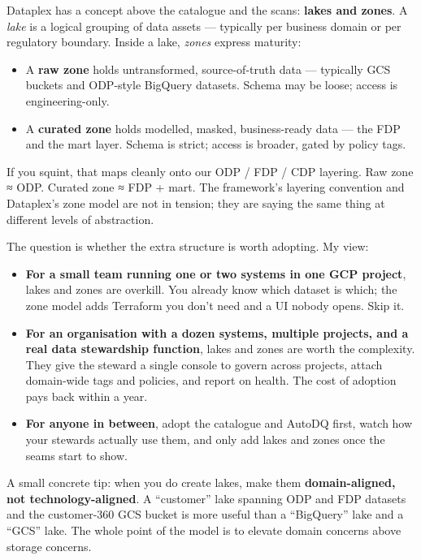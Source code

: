 \documentclass[
  11pt,
  british,
  oneside]{book}
\providecommand{\tightlist}{%
  \setlength{\itemsep}{0pt}\setlength{\parskip}{0pt}}
\begin{document}
Dataplex has a concept above the catalogue and the scans: \textbf{lakes
and zones}. A \emph{lake}
is a logical grouping of data assets --- typically per business domain
or per regulatory boundary. Inside a lake, \emph{zones} express
maturity:

\begin{itemize}
\tightlist
\item
  A \textbf{raw zone} holds untransformed, source-of-truth data ---
  typically GCS buckets and ODP-style BigQuery datasets. Schema may be
  loose; access is engineering-only.
\item
  A \textbf{curated zone} holds modelled, masked, business-ready data
  --- the FDP and the mart layer. Schema is strict; access is broader,
  gated by policy tags.
\end{itemize}

If you squint, that maps cleanly onto our ODP / FDP / CDP layering. Raw
zone ≈ ODP. Curated zone ≈ FDP + mart. The framework's layering
convention and Dataplex's zone model are not in tension; they are saying
the same thing at different levels of abstraction.

The question is whether the extra structure is worth adopting. My view:

\begin{itemize}
\tightlist
\item
  \textbf{For a small team running one or two systems in one GCP
  project}, lakes and zones are overkill. You already know which dataset
  is which; the zone model adds Terraform you don't need and a UI nobody
  opens. Skip it.
\item
  \textbf{For an organisation with a dozen systems, multiple projects,
  and a real data stewardship function}, lakes and zones are worth the
  complexity. They give the steward a single console to govern across
  projects, attach domain-wide tags and policies, and report on health.
  The cost of adoption pays back within a year.
\item
  \textbf{For anyone in between}, adopt the catalogue and AutoDQ first,
  watch how your stewards actually use them, and only add lakes and
  zones once the seams start to show.
\end{itemize}

A small concrete tip: when you do create lakes, make them
\textbf{domain-aligned, not technology-aligned}. A ``customer'' lake
spanning ODP and FDP datasets and the customer-360 GCS bucket is more
useful than a ``BigQuery'' lake and a ``GCS'' lake. The whole point of
the model is to elevate domain concerns above storage concerns.
\end{document}
